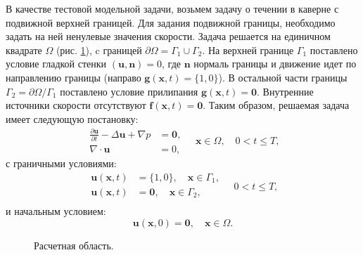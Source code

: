 \documentclass[12pt]{article}
\begin{document}
В качестве тестовой модельной задачи, возьмем задачу о течении в каверне с подвижной верхней границей. 
Для задания подвижной границы, необходимо задать на ней ненулевые значения скорости.
Задача решается на единичном квадрате $\Omega$ (рис. \ref{fg:cavity}), c границей $\partial \Omega=\Gamma_1 \cup \Gamma_2$. На верхней границе $\Gamma_1$ поставлено условие гладкой стенки $({\bm u}, {\bm n}) = 0$, где ${\bm n}$ нормаль границы и движение идет по направлению границы (направо ${\bm g}({\bm x},t)=\{1,0\}$). 
В остальной части границы $\Gamma_2=\partial \Omega / \Gamma_1$ поставлено условие прилипания ${\bm g}({\bm x}, t)={\bm 0}$. Внутренние источники скорости отсутствуют ${\bm f}({\bm x}, t)={\bm 0}$. Таким образом, решаемая задача имеет следующую постановку:
\begin{equation}
\begin{aligned}
\frac{\partial {\bm u}}{\partial t} -\Delta {\bm u} + \nabla p &= {\bm 0}, \\
\nabla\cdot{\bm u} &= 0, 
\end{aligned}
\quad {\bm x} \in \Omega, \quad 0<t \leq T,
\label{eq:scheme-main}
\end{equation} 
с граничными условиями:
\begin{equation}
\begin{split}
{\bm u({\bm x}, t)} &= \{1, 0\}, \quad {\bm x} \in \Gamma_1, \\
{\bm u({\bm x}, t)} &= {\bm 0}, \quad {\bm x} \in \Gamma_2, \\
\end{split}
\quad 0<t \leq T,
\label{eq:scheme-boundary}
\end{equation} 
и начальным условием:
\begin{equation}
{\bm u({\bm x}, 0)} = {\bm 0}, \quad {\bm x} \in \Omega.
\label{eq:scheme-start}
\end{equation}

\begin{figure}
	\begin{center}
		\caption{Расчетная область.}
		\label{fg:cavity}
	\end{center}
\end{figure}
\end{document}

